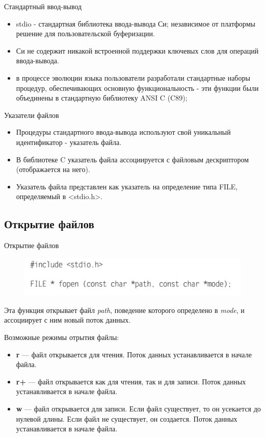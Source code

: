 \documentclass{beamer}
\begin{document}
\begin{frame}{Стандартный ввод-вывод}
\begin{itemize}
\item stdio - стандартная библиотека ввода-вывода Си; независимое от платформы решение для пользовательской буферизации. 
\item Си не содержит никакой встроенной поддержки ключевых слов для операций ввода-вывода. 
\item в процессе эволюции языка пользователи разработали стандартные наборы процедур, обеспечивающих основную функциональность - эти функции были объединены в стандартную библиотеку ANSI C (C89);
\end{itemize}
\begin{block}{Указатели файлов}
\begin{itemize}
\item Процедуры стандартного ввода-вывода используют свой уникальный идентификатор - указатель файла. 
\item В библиотеке C указатель файла ассоциируется с файловым дескриптором (отображается на него). 
\item Указатель файла представлен как указатель на определение типа FILE, определяемый в <stdio.h>.
\end{itemize}
\end{block}
\end{frame}

\subsection{Открытие файлов}
\begin{frame}{Открытие файлов}
\begin{figure}[h]
\centering
\includegraphics[scale=0.5]{images/lec05-pic04.png}
\end{figure}
Эта функция открывает файл \textit{path}, поведение которого определено в \textit{mode}, и ассоциирует с ним новый поток данных.

Возможные режимы отрытия файлы:
\begin{itemize}
\item \textbf{r} — файл открывается для чтения. Поток данных устанавливается в начале файла.
\item \textbf{r+} — файл открывается как для чтения, так и для записи. Поток данных устанавливается в начале файла.
\item \textbf{w} — файл открывается для записи. Если файл существует, то он усекается до
нулевой длины. Если файл не существует, он создается. Поток данных устанавливается в начале файла.
\end{itemize}
\end{frame}
\end{document}
